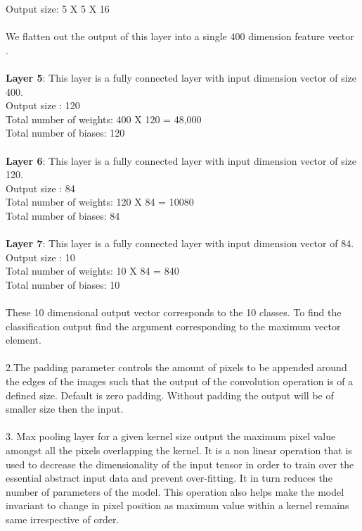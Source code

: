 \documentclass[answers]{exam}
\begin{document}
\begin{solution}
Output size: 5 X 5 X 16\\
\\
We flatten out the output of this layer into a single 400 dimension feature vector .\\
\\
\textbf{Layer 5}: This layer is a fully connected layer with input dimension vector of size 400.\\
Output size : 120\\
Total number of weights: 400 X 120 = 48,000\\
Total number of biases: 120\\
\\
\textbf{Layer 6}: This layer is a fully connected layer with input dimension vector of size 120.\\
Output size : 84\\
Total number of weights: 120 X 84 = 10080\\
Total number of biases: 84\\
\\
\textbf{Layer 7}: This layer is a fully connected layer with input dimension vector of 84.\\
Output size : 10\\
Total number of weights: 10 X 84 = 840\\
Total number of biases: 10\\
\\
These 10 dimensional output vector corresponds to the 10 classes. To find the classification output find the argument corresponding to the maximum vector element.\\
\\
2.The padding parameter controls the amount of pixels to be appended around the edges of the images such that the output of the convolution operation is of a defined size. Default is zero padding. Without padding the output will be of smaller size then the input.\\
\\
3. Max pooling layer for a given kernel size output the maximum pixel value amongst all the pixels overlapping the kernel. It is a non linear operation that is used to decrease the dimensionality of the input tensor in order to train over the essential abstract input data and prevent over-fitting. It in turn reduces the number of parameters of the model. This operation also helps make the model invariant to change in pixel position as maximum value within a kernel remains same irrespective of order.\\

\end{solution}
\end{document}
